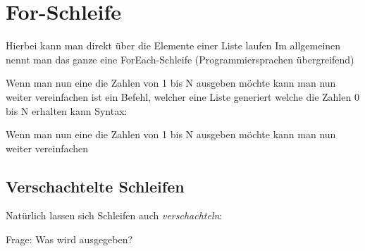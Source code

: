 \section{For-Schleife}
\begin{frame}[fragile]
    \slidehead
    Hierbei kann man direkt über die Elemente einer Liste laufen
    Im allgemeinen nennt man das ganze eine ForEach-Schleife (Programmiersprachen übergreifend)
\end{frame}

\livecoding

\begin{frame}
    \slidehead
    Wenn man nun eine die Zahlen von 1 bis N ausgeben möchte kann man nun weiter vereinfachen
     ist ein Befehl, welcher eine Liste generiert welche die Zahlen 0 bis N erhalten kann
    Syntax: 
\end{frame}

\begin{frame}
    \slidehead
    Wenn man nun eine die Zahlen von 1 bis N ausgeben möchte kann man nun weiter vereinfachen
\end{frame}

\subsection{Verschachtelte Schleifen}
\begin{frame}
    \slidehead

    Natürlich lassen sich Schleifen auch \textit{verschachteln}:

    \pause
    \begin{block}{Frage: Was wird ausgegeben?}\pause
        \\
        \\
        \\
    \end{block}
\end{frame}

\livecoding

